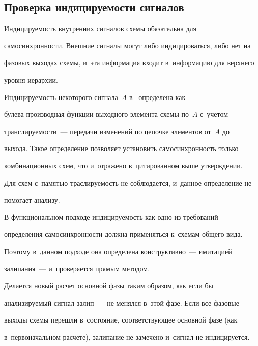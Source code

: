 \subsection{Проверка индицируемости сигналов}


       


   Индицируемость внутренних сигналов схемы обязательна для 


самосинхронности. Внешние сигналы могут либо индицироваться, либо нет на 


фазовых выходах схемы, и~эта информация входит в~информацию для верхнего 


уровня иерархии.


   


   Индицируемость некоторого сигнала~$A$ в~\cite{1-pl} определена как 


булева производная функции выходного элемента схемы по~$A$ с~учетом 


транслируемости~--- передачи изменений по цепочке элементов от~$A$ до 


выхода. Такое определение позволяет установить самосинхронность только 


комбинационных схем, что и~отражено в~цитированном выше утверждении. 


Для схем с~памятью траслируемость не соблюдается, и~данное определение не 


помогает анализу.


   


   В функциональном подходе индицируемость как одно из требований 


определения самосинхронности должна применяться к~схемам общего вида. 


Поэтому в~данном подходе она определена конструктивно~--- имитацией 


залипания~--- и~проверяется прямым методом.


   


   Делается новый расчет основной фазы таким образом, как если бы 


анализируемый сигнал залип~--- не менялся в~этой фазе. Если все фазовые 


выходы схемы перешли в~состояние, соответствующее основной фазе (как 


в~первоначальном расчете), залипание не замечено и~сигнал не индицируется. 


